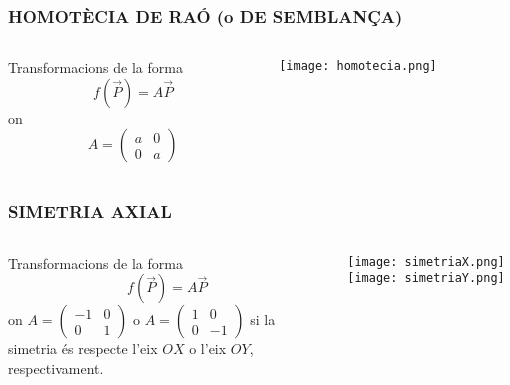 \documentclass{beamer}
\begin{document}
\begin{frame}
  \frametitle{HOMOTÈCIA DE RAÓ (o DE SEMBLANÇA)}
  \begin{columns}
    \begin{column}{0.5\textwidth}
      \begin{definicio}
        Transformacions de la forma
        \[
        f(\overrightarrow{P})=A \overrightarrow{P}
        \]
        on
        \[
        A = \begin{pmatrix}a&0\\0&a\end{pmatrix}
        \]
      \end{definicio}
    \end{column}
    \begin{column}{0.5\textwidth}
      \begin{center}
        \texttt{[image: homotecia.png]}
      \end{center}
    \end{column}
  \end{columns}
\end{frame}
\begin{frame}
  \frametitle{SIMETRIA AXIAL}
  \begin{columns}
    \begin{column}{0.5\textwidth}
      \begin{definicio}
        Transformacions de la forma
        \[
        f(\overrightarrow{P})=A \overrightarrow{P}
        \]
        on
        $A = \begin{pmatrix}-1&0\\0&1\end{pmatrix}$ o $A = \begin{pmatrix}1&0\\0&-1\end{pmatrix}$
        si la simetria és respecte l'eix $OX$ o l'eix $OY$, respectivament.
      \end{definicio}
    \end{column}
    \begin{column}{0.5\textwidth}
      \begin{center}
        \texttt{[image: simetriaX.png]}
        \texttt{[image: simetriaY.png]}
      \end{center}
    \end{column}
  \end{columns}
\end{frame}
\end{document}
